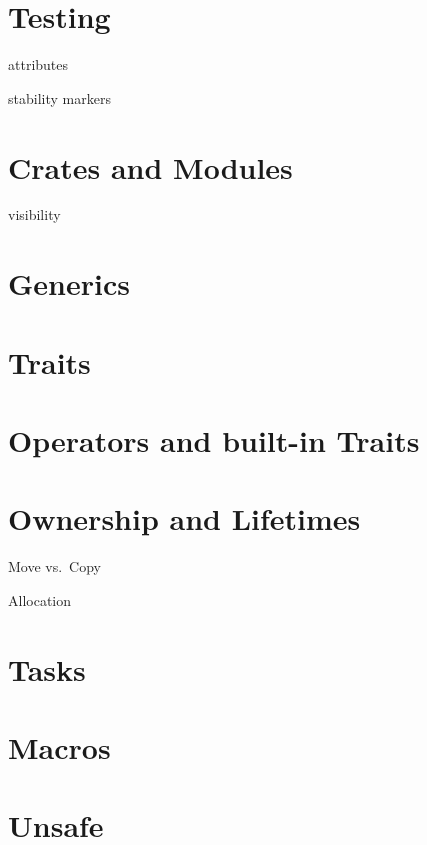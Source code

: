\documentclass[]{article}
\begin{document}
\section{Testing}\label{testing}

attributes

stability markers

\section{Crates and Modules}\label{crates-and-modules}

visibility

\section{Generics}\label{generics}

\section{Traits}\label{traits}

\section{Operators and built-in
Traits}\label{operators-and-built-in-traits}

\section{Ownership and Lifetimes}\label{ownership-and-lifetimes}

Move vs.~Copy

Allocation

\section{Tasks}\label{tasks}

\section{Macros}\label{macros}

\section{Unsafe}\label{unsafe}
\end{document}
